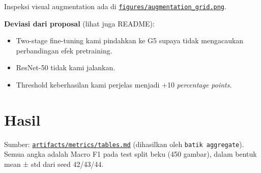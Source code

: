 \documentclass[10pt,a4paper]{article}
\providecommand{\tightlist}{\setlength{\itemsep}{2pt}\setlength{\parskip}{0pt}}
\begin{document}
Inspeksi visual augmentation ada di \href{https://github.com/Universitas-Cakrawala/semarang-batik-fine-grained-transfer-learning/blob/main/figures/augmentation_grid.png}{\texttt{figures/\allowbreak{}augmentation\_\allowbreak{}grid.png}}.

\textbf{Deviasi dari proposal} (lihat juga README):

\begin{itemize}
\tightlist
\item
  Two-stage fine-tuning kami pindahkan ke G5 supaya tidak mengacaukan perbandingan efek pretraining.
\item
  ResNet-50 tidak kami jalankan.
\item
  Threshold keberhasilan kami perjelas menjadi +10 \emph{percentage points}.
\end{itemize}

\section{Hasil}\label{hasil}

Sumber: \href{https://github.com/Universitas-Cakrawala/semarang-batik-fine-grained-transfer-learning/blob/main/artifacts/metrics/tables.md}{\texttt{artifacts/\allowbreak{}metrics/\allowbreak{}tables.md}} (dihasilkan oleh \texttt{batik\ aggregate}). Semua angka adalah Macro F1 pada test split beku (450 gambar), dalam bentuk mean ± std dari seed 42/43/44.
\end{document}
